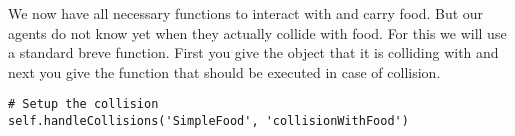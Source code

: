 We now have all necessary functions to interact with and carry food. But our agents do not know yet when they actually collide with food. For this we will use a standard breve function. First you give the object that it is colliding with and next you give the function that should be executed in case of collision.
\begin{fullwidth}
\begin{lstlisting}
# Setup the collision
self.handleCollisions('SimpleFood', 'collisionWithFood')
\end{lstlisting}
\end{fullwidth}


